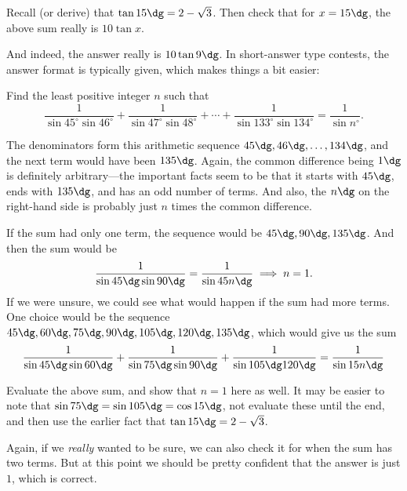 \documentclass[11pt,paper=letter]{scrartcl}
\begin{document}
\begin{exrboxed}
  Recall (or derive) that $\tan 15\dg = 2 - \sqrt{3}$. Then check that for $x = 15\dg$, the above sum really is $10 \tan x$.
\end{exrboxed}

And indeed, the answer really is $10 \tan 9\dg$. In short-answer type contests, the answer format is typically given, which makes things a bit easier:

\begin{exboxed}[AIME II 2000/15]
  Find the least positive integer $n$ such that \[ \frac 1{\sin 45^\circ\sin 46^\circ}+\frac 1{\sin 47^\circ\sin 48^\circ}+\cdots+\frac 1{\sin 133^\circ\sin 134^\circ}=\frac 1{\sin n^\circ}. \]
\end{exboxed}

The denominators form this arithmetic sequence $45\dg, 46\dg, \ldots, 134\dg$, and the next term would have been $135\dg$. Again, the common difference being $1\dg$ is definitely arbitrary---the important facts seem to be that it starts with $45\dg$, ends with $135\dg$, and has an odd number of terms. And also, the $n\dg$ on the right-hand side is probably just $n$ times the common difference.

If the sum had only one term, the sequence would be $45\dg, 90\dg, 135\dg$. And then the sum would be
\[
  \frac{1}{\sin 45\dg \sin 90\dg} = \frac{1}{\sin 45n\dg} \implies n = 1.
\]
If we were unsure, we could see what would happen if the sum had more terms. One choice would be the sequence $45\dg, 60\dg, 75\dg, 90\dg, 105\dg, 120\dg, 135\dg$, which would give us the sum
\[
  \frac{1}{\sin 45\dg \sin 60\dg} + \frac{1}{\sin 75\dg \sin 90\dg} + \frac{1}{\sin 105\dg 120\dg} = \frac{1}{\sin 15n\dg}
\]
\begin{exrboxed}
Evaluate the above sum, and show that $n = 1$ here as well. It may be easier to note that $\sin 75\dg = \sin 105\dg = \cos 15\dg$, not evaluate these until the end, and then use the earlier fact that $\tan 15\dg = 2 - \sqrt{3}$.
\end{exrboxed}
Again, if we \textit{really} wanted to be sure, we can also check it for when the sum has two terms. But at this point we should be pretty confident that the answer is just $1$, which is correct.
\end{document}
